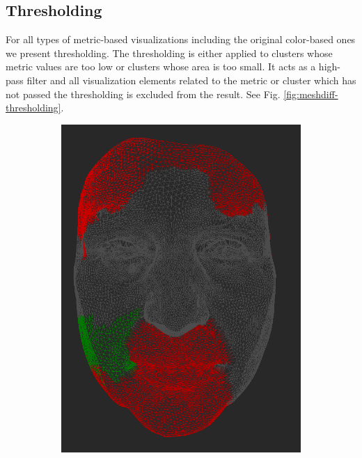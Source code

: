 \subsection{Thresholding}
\label{subsec:analysis-visualizations-thresholding}

For all types of metric-based visualizations including the original color-based ones we present thresholding. The thresholding is either applied to clusters whose metric values are too low or clusters whose area is too small. It acts as a high-pass filter and all visualization elements related to the metric or cluster which has not passed the thresholding is excluded from the result. See Fig. \ref{fig:meshdiff-thresholding}.

\begin{figure}[h]
\centering
	\begin{subfigure}{0.4\textwidth}
	\includegraphics[width=\textwidth]{./img/meshdiff-thresholding-clustercolor-length3.PNG}

\end{subfigure}
\end{figure}
